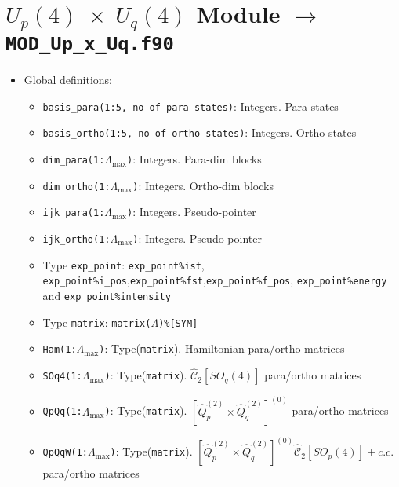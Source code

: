 \documentclass[english,twoside, openright]{report}
\newcommand{\cas}[2]{
  \hat{\mathcal{C}}_{#1}\left[#2\right]
}
\begin{document}
\section{$U_p(4)\;\times\;U_q(4)$ Module $\rightarrow$ \texttt{MOD\_Up\_x\_Uq.f90}}

\begin{itemize}
\item Global definitions:
  \begin{itemize}
  \item \texttt{basis\_para(1:5, no of para-states)}: Integers. Para-states
  \item \texttt{basis\_ortho(1:5, no of ortho-states)}: Integers. Ortho-states
  \item \texttt{dim\_para(1:$\Lambda_{\text{max}}$)}: Integers. Para-dim blocks
  \item \texttt{dim\_ortho(1:$\Lambda_{\text{max}}$)}: Integers. Ortho-dim blocks
  \item \texttt{ijk\_para(1:$\Lambda_{\text{max}}$)}: Integers. Pseudo-pointer
  \item \texttt{ijk\_ortho(1:$\Lambda_{\text{max}}$)}: Integers. Pseudo-pointer
  \item Type \texttt{exp\_point}: \texttt{exp\_point\%ist}, \texttt{exp\_point\%i\_pos},\texttt{exp\_point\%fst},\texttt{exp\_point\%f\_pos}, \texttt{exp\_point\%energy} and \texttt{exp\_point\%intensity}
  \item Type \texttt{matrix}: \texttt{matrix($\Lambda$)\%[SYM]}
  \item \texttt{Ham(1:$\Lambda_{\text{max}}$)}: Type(\texttt{matrix}). Hamiltonian para/ortho matrices
  \item \texttt{SOq4(1:$\Lambda_{\text{max}}$)}: Type(\texttt{matrix}). $\cas{2}{SO_q(4)}$ para/ortho matrices
  \item \texttt{QpQq(1:$\Lambda_{\text{max}}$)}: Type(\texttt{matrix}). $\left[\hat{Q}_p^{(2)}\times\hat{Q}_q^{(2)}\right]^{(0)}$ para/ortho matrices
  \item \texttt{QpQqW(1:$\Lambda_{\text{max}}$)}: Type(\texttt{matrix}). $\left[\hat{Q}_p^{(2)}\times\hat{Q}_q^{(2)}\right]^{(0)} \cas{2}{SO_p(4)} + c.c.$ para/ortho matrices
  

\end{itemize}
\end{itemize}
\end{document}

